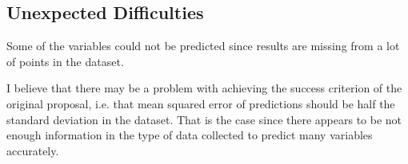 \documentclass[11pt, a4paper]{article}
\begin{document}
\subsection*{Unexpected Difficulties}
Some of the variables could not be predicted since results are missing from a lot of points in the dataset.
  
I believe that there may be a problem with achieving the success criterion of the original proposal, i.e. that mean squared error of predictions should be half the standard deviation in the dataset.
That is the case since there appears to be not enough information in the type of data collected to predict many variables accurately.
\end{document}
